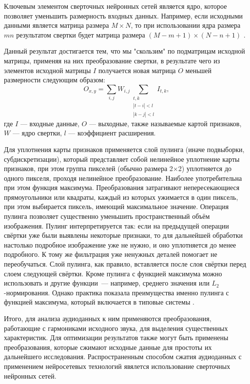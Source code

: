 Ключевым элементом сверточных нейронных сетей является ядро, которое позволяет уменьшить размерность входных данных.
Например, если исходными данными является матрица размера $M\times N$, то при использовании ядра размера $mn$ результатом свертки будет
матрица размера $(M-m+1)\times(N-n+1)$ \cite{cyberbred}.

Данный результат достигается тем, что мы "скользим" по подматрицам исходной матрицы, применяя на них преобразование свертки,
в результате чего из элементов исходной матрицы $I$ получается новая матрица $O$ меньшей размерности следующим образом:
\begin{equation}
	O_{x,y} = \sum_{i,j} W_{i,j} \sum_{\substack{t,k\\\left|t-i\right|<l\\ \left|k-j\right|<l} } I_{t,k},
\end{equation}
где 
$I$ — входные данные, $O$ — выходные, также называемые картой признаков, $W$ — ядро свертки, $l$ — коэффициент расширения. 

Для уплотнения карты признаков применяется слой пулинга (иначе подвыборки, субдискретизации), который представляет собой нелинейное уплотнение карты признаков, при этом группа пикселей (обычно размера 2×2) уплотняется до одного пикселя, проходя нелинейное преобразование. Наиболее употребительна при этом функция максимума. Преобразования затрагивают непересекающиеся прямоугольники или квадраты, каждый из которых ужимается в один пиксель, при этом выбирается пиксель, имеющий максимальное значение. Операция пулинга позволяет существенно уменьшить пространственный объём изображения. Пулинг интерпретируется так: если на предыдущей операции свёртки уже были выявлены некоторые признаки, то для дальнейшей обработки настолько подробное изображение уже не нужно, и оно уплотняется до менее подробного. К тому же фильтрация уже ненужных деталей помогает не переобучаться. Слой пулинга, как правило, вставляется после слоя свёртки перед слоем следующей свёртки.
Кроме пулинга с функцией максимума можно использовать и другие функции — например, среднего значения или $L_2$-нормирования. Однако практика показала преимущества именно пулинга с функцией максимума, который включается в типовые системы \cite{wikiconv}. 

Итого, для анализа аудиоданных к ним применяются преобразования, работающие с гармониками исходного звука, для выделения
существенных характеристик. Для оптимизации результатов также могут быть применены преобразования, которые сжимают исходные данные для простоты их дальнейшего исследования.
Распространенным способом сжатия аудиоданных с применением нейросетевых технологий явялется использование сверточных нейронных сетей.

